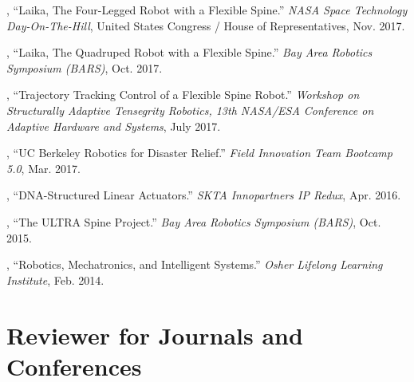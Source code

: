 \documentclass[letterpaper]{deedy-resume} %
\begin{document}
{\begin{etaremune}[itemsep=0.1cm]
\item \underline{{}}, ``Laika, The Four-Legged Robot with a Flexible Spine.'' {\it NASA Space Technology Day-On-The-Hill}, United States Congress / House of Representatives, Nov. 2017.

\item \underline{{}}, ``Laika, The Quadruped Robot with a Flexible Spine.'' {\it Bay Area Robotics Symposium (BARS)}, Oct. 2017.

\item \underline{{}}, ``Trajectory Tracking Control of a Flexible Spine Robot.'' {\it Workshop on Structurally Adaptive Tensegrity Robotics, 13th NASA/ESA Conference on Adaptive Hardware and Systems}, July 2017.

\item \underline{{}}, ``UC Berkeley Robotics for Disaster Relief.'' {\it Field Innovation Team Bootcamp 5.0}, Mar. 2017.

\item \underline{{}}, ``DNA-Structured Linear Actuators.'' {\it  SKTA Innopartners IP Redux}, Apr. 2016.

\item \underline{{}}, ``The ULTRA Spine Project.'' {\it Bay Area Robotics Symposium (BARS)}, Oct. 2015.

\item \underline{{}}, ``Robotics, Mechatronics, and Intelligent Systems.'' {\it Osher Lifelong Learning Institute}, Feb. 2014.

 \end{etaremune}



\section{Reviewer for Journals and Conferences}



\vspace{0.4cm}

}
\end{document}

